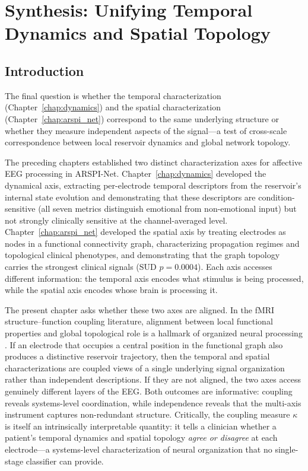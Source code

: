 \chapter{Synthesis: Unifying Temporal Dynamics and Spatial Topology}
\label{chap:synthesis}

\section{Introduction}
\label{sec:ch7_intro}

The final question is whether the temporal characterization (Chapter~\ref{chap:dynamics}) and the spatial characterization (Chapter~\ref{chap:arspi_net}) correspond to the same underlying structure or whether they measure independent aspects of the signal---a test of cross-scale correspondence between local reservoir dynamics and global network topology.

The preceding chapters established two distinct characterization axes for affective EEG processing in ARSPI-Net. Chapter~\ref{chap:dynamics} developed the dynamical axis, extracting per-electrode temporal descriptors from the reservoir's internal state evolution and demonstrating that these descriptors are condition-sensitive (all seven metrics distinguish emotional from non-emotional input) but not strongly clinically sensitive at the channel-averaged level. Chapter~\ref{chap:arspi_net} developed the spatial axis by treating electrodes as nodes in a functional connectivity graph, characterizing propagation regimes and topological clinical phenotypes, and demonstrating that the graph topology carries the strongest clinical signals (SUD $p = 0.0004$). Each axis accesses different information: the temporal axis encodes what stimulus is being processed, while the spatial axis encodes whose brain is processing it.

The present chapter asks whether these two axes are aligned. In the fMRI structure--function coupling literature, alignment between local functional properties and global topological role is a hallmark of organized neural processing \cite{Deco2015,honey_network_2007,suarez_linking_2020}. If an electrode that occupies a central position in the functional graph also produces a distinctive reservoir trajectory, then the temporal and spatial characterizations are coupled views of a single underlying signal organization rather than independent descriptions. If they are not aligned, the two axes access genuinely different layers of the EEG. Both outcomes are informative: coupling reveals systems-level coordination, while independence reveals that the multi-axis instrument captures non-redundant structure. Critically, the coupling measure $\kappa$ is itself an intrinsically interpretable quantity: it tells a clinician whether a patient's temporal dynamics and spatial topology \emph{agree or disagree} at each electrode---a systems-level characterization of neural organization that no single-stage classifier can provide.

